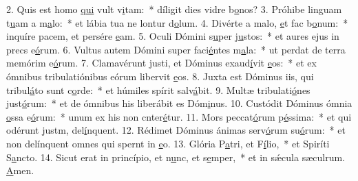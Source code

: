2. Quis est homo \uline{qui} vult v\uline{i}tam:~* díligit dies vidre b\uline{o}nos?
3. Próhibe linguam t\uline{u}am a m\uline{a}lo:~* et lábia tua ne lontur d\uline{o}lum.
4. Divérte a malo, \uline{e}t fac b\uline{o}num:~* inquíre pacem, et persére \uline{e}am.
5. Oculi Dómini s\uline{u}per j\uline{u}stos:~* et aures ejus in precs e\uline{ó}rum.
6. Vultus autem Dómini super faci\uline{é}ntes m\uline{a}la:~* ut perdat de terra memórim e\uline{ó}rum.
7. Clamavérunt justi, et Dóminus exaud\uline{í}vit \uline{e}os:~* et ex ómnibus tribulatiónibus eórum libervit \uline{e}os.
8. Juxta est Dóminus iis, qui tribul\uline{á}to sunt c\uline{o}rde:~* et húmiles spírit salv\uline{á}bit.
9. Multæ tribulati\uline{ó}nes just\uline{ó}rum:~* et de ómnibus his liberábit es Dóm\uline{i}nus.
10. Custódit Dóminus ómnia \uline{o}ssa e\uline{ó}rum:~* unum ex his non cnter\uline{é}tur.
11. Mors peccat\uline{ó}rum p\uline{é}ssima:~* et qui odérunt justm, del\uline{í}nquent.
12. Rédimet Dóminus ánimas serv\uline{ó}rum su\uline{ó}rum:~* et non delínquent omnes qui spernt in \uline{e}o.
13. Glória P\uline{a}tri, et F\uline{í}lio,~* et Spiríti S\uline{a}ncto.
14. Sicut erat in princípio, et n\uline{u}nc, et s\uline{e}mper,~* et in sǽcula sæculrum. \uline{A}men.
